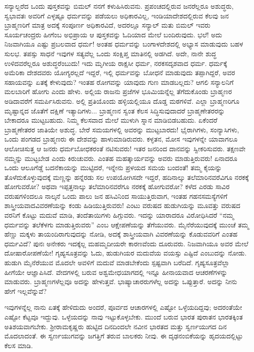 ಸನ್ಯಾಲ್\enginline{-}ಬರೆದ ಒಂದು ಪುಸ್ತಕವನ್ನು ಬಿಮಲ್ ನನಗೆ ಕಳುಹಿಸಿರುವನು. ಪ್ರಪಂಚದಲ್ಲಿರುವ ಜನರೆಲ್ಲರೂ ಅಶುದ್ಧರು, ಸ್ವಭಾವತಃ ಅವರಿಗೆ ಎಳ್ಳಷ್ಟೂ ಧರ್ಮವನ್ನು ಪಡೆಯಲು ಅಧಿಕಾರವಿಲ್ಲ, ಇಂಡಿಯಾದೇಶದಲ್ಲಿರುವ ಕೆಲವು ಜನ ಬ್ರಾಹ್ಮಣರಿಗೆ ಮಾತ್ರ ಅದಕ್ಕೆ ಸಂಪೂರ್ಣ ಅಧಿಕಾರವಿದೆ, ಅದರಲ್ಲೂ ಸನ್ಯಾಲ್ ಮತು ಬಿಮಲ್ ಇವರು ಸೂರ್ಯಚಂದ್ರರು\enginline{-} ಹೀಗೆಂಬ ಅಭಿಪ್ರಾಯ ಆ ಪುಸ್ತಕವನ್ನು ಓದಿಯಾದ ಮೇಲೆ ಬಂದಿರುವುದು. ಭಲೆ! ಅದು ನಿಜವಾಗಿಯೂ ಎಷ್ಟು ಪ್ರಬಲವಾದ ಧರ್ಮ! ಅಂತಹ ಧರ್ಮವನ್ನು ಬಂಗಾಳದೇಶದಲ್ಲಿ ಅಭ್ಯಾಸ ಮಾಡುವುದು ಬಹಳ ಸುಲಭ. ತಪಸ್ಸು ಸಾಧನೆ ಇವುಗಳ ಸತ್ಯವೆಲ್ಲ ಒಂದು ಸಂಕ್ಷಿಪ್ತ ಮಾತಿನಲ್ಲಿ ಅಡಗಿದೆ. ಅದೇ, ನಾನೇ ಶುದ್ಧ ಉಳಿದವರೆಲ್ಲರೂ ಅಶುದ್ಧರೆಂಬುದು! ಇದು ಮೃಗೀಯ ರಾಕ್ಷಸೀ ಧರ್ಮ, ನರಕಸದೃಶವಾದ ಧರ್ಮ. ಧರ್ಮಕ್ಕೆ ಅಮೆರಿಕಾ ದೇಶದವರು ಯೋಗ್ಯರಲ್ಲದೆ ಇದ್ದರೆ, ಇಲ್ಲಿ ಧರ್ಮವನ್ನು ಬೋಧನೆ ಮಾಡುವುದು ತಪ್ಪಾಗಿದ್ದರೆ, ಅವರ ಸಹಾಯವನ್ನು ಏತಕ್ಕೆ ಕೇಳುವುದು? ಇಂತಹ ರೋಗವನ್ನು ಯಾವುದು ಗುಣ ಮಾಡಬಲ್ಲದು? ಆಗಲಿ ಸನ್ಯಾಲನಿಗೆ ಮಲಬಾರಿಗೆ ಹೋಗು ಎಂದು ಹೇಳು. ಅಲ್ಲಿಯ ರಾಜನು ಪ್ರಜೆಗಳ ಭೂಮಿಯನ್ನೆಲ್ಲ ತೆಗೆದುಕೊಂಡು ಬ್ರಾಹ್ಮಣರ ಅಡಿದಾವರೆಗೆ ಸಮರ್ಪಿಸಿರುವನು. ಅಲ್ಲಿ ಪ್ರತಿಯೊಂದು ಹಳ್ಳಿಯಲ್ಲಿಯೂ ದೊಡ್ಡ ಮಠಗಳಿವೆ. ಎಲ್ಲಾ ಬ್ರಾಹ್ಮಣರಿಗೂ ಮೃಷ್ಟಾನ್ನದ ಜೊತೆಗೆ ದಕ್ಷಿಣೆ ಇತ್ಯಾದಿಗಳು... ಬ್ರಾಹ್ಮಣನ ಸ್ವಂತ ಕೆಲಸ ಸಿದ್ಧಿಸುವುದಾದರೆ ಬ್ರಾಹ್ಮಣೇತರರನ್ನು ಬೇಕಾದರೂ ಮುಟ್ಟಬಹುದು. ನಿಮ್ಮ ಕೆಲಸವಾದ ಮೇಲೆ ಮುಳುಗಿ ಸ್ನಾನ ಮಾಡಿಬಿಡಬಹುದು. ಏಕೆಂದರೆ ಬ್ರಾಹ್ಮಣೇತರರ ಜಾತಿಯೇ ಅಶುದ್ಧ. ಬೇರೆ ಸಮಯಗಳಲ್ಲಿ ಅವರನ್ನು ಮುಟ್ಟಬಾರದು! ಭೈರಾಗಿಗಳು, ಸಂನ್ಯಾಸಿಗಳು, ಒಂದು ಪಂಗಡದ ಬ್ರಾಹ್ಮಣರು ಈ ದೇಶವನ್ನು ಹಾಳುಮಾಡಿರುವರು. ಕಳ್ಳತನ, ಮೋಸ ಇವುಗಳನ್ನೇ ಯಾವಾಗಲೂ ಆಲೋಚಿಸುತ್ತ ಆ ಜನರು ಧರ್ಮಬೋಧಕರಂತೆ ನಟಿಸುವರು! ಇತರ ಜನರಿಂದ ದಾನವನ್ನು ಸ್ವೀಕರಿಸುವರು. ತಕ್ಷಣವೇ ನಮ್ಮನ್ನು ಮುಟ್ಟಬೇಡ ಎಂದು ಕಿರುಚುವರು. ಎಂತಹ ಮಹತ್ಕಾರ್ಯವನ್ನು ಅವರು ಮಾಡುತ್ತಿರುವರು!\enginline{-} ಏನಾದರೂ ಒಂದು ಆಲೂಗೆಡ್ಡೆ ಬದನೆಕಾಯನ್ನು ಮುಟ್ಟಿದರೆ, ಇನ್ನೇನು ಪ್ರಳಯದ ಸಮಯ ಬಂದಂತೆ! ತಮ್ಮ ಕೈಯನ್ನು ತೊಳೆದುಕೊಳ್ಳುವುದಕ್ಕೆ ಮಣ್ಣನ್ನು ಹನ್ನೆರಡು ಸಲ ಉಪಯೋಗಿಸದೇ ಇದ್ದರೆ, ಹದಿನಾಲ್ಕು ತಲೆಮಾರಿನವರೆವಿಗೂ ನರಕಕ್ಕೆ ಹೋಗುವರೋ? ಅಥವಾ ಇಪ್ಪತ್ತನಾಲ್ಕು ತಲೆಮಾರಿನವರೆಗೂ ನರಕಕ್ಕೆ ಹೋಗುವರೋ? ಕಳೆದ ಎರಡು ಸಾವಿರ ವರುಷಗಳಿಂದಲೂ ನಾಲ್ಕನೆ ಒಂದು ಪಾಲು ಜನ ಹಸಿವಿನಿಂದ ಸಾಯುತ್ತಿರುವಾಗ, ಇಂತಹ ಗಹನಸಮಸ್ಯೆಗಳಿಗೆ ಶಾಸ್ತ್ರೀಯವಾದವಿವರಣೆಯನ್ನು ಕಂಡು ಹಿಡಿಯುತ್ತಿರುವರು! ಎಂಟು ವರುಷದ ಹುಡುಗಿಯನ್ನು ಮೂವತ್ತು ವರುಷದ ವರನಿಗೆ ಕೊಟ್ಟು ಮದುವೆ ಮಾಡಿ, ತಂದೆತಾಯಿಗಳು ಹಿಗ್ಗುವರು. ಇದನ್ನು ಯಾರಾದರೂ ವಿರೋಧಿಸಿದರೆ ``ನಮ್ಮ ಧರ್ಮವನ್ನು ತಲೆಕೆಳಗು ಮಾಡುತ್ತಿರುವರು'' ಎಂಬ ಆಕ್ಷೇಪಣೆಯನ್ನು ತೆಗೆಯುವರು. ಮೈನೆರೆಯುವುದಕ್ಕೆ ಮುಂಚೆ ತಮ್ಮ ಹೆಣ್ಣು ಮಕ್ಕಳು ತಾಯಂದಿರಾಗುವುದನ್ನು ನೋಡಿ, ಅದಕ್ಕೆ ಶಾಸ್ತ್ರೀಯವಾಗಿ ವಿವರಣೆಯನ್ನು ಕೊಡುವವರಿಗೆ ಎಂತಹ ಧರ್ಮವಿದೆ? ಪುನಃ ಅನೇಕರು ಇದಕ್ಕೆಲ್ಲ ಮಹಮ್ಮದೀಯರೇ ಕಾರಣವೆಂದು ದೂರುವರು. ನಿಜವಾಗಿಯೂ ಅವರ ಮೇಲೆ ದೋಷಾರೋಪಣೆಯೇ! ಗೃಹ್ಯಸೂತ್ರವನ್ನು ಓದು, ಹುಡುಗಿಯರ ಮದುವೆಯ ವಯಸ್ಸು ಎಷ್ಟಿದೆ ಎಂಬುದನ್ನು ನೋಡು. ಹುಡುಗಿ ಮೈನೆರೆಯುವ ಮೊದಲೇ ಅವಳಿಗೆ ಮದುವೆ ಮಾಡಬೇಕೆಂದು ಸ್ಪಷ್ಟವಾಗಿ ಬರೆದಿದೆ. ಗೃಹ್ಯಸೂತ್ರವೆಲ್ಲಾ ಹೀಗೆಯೇ ಆಜ್ಞಾಪಿಸಿದೆ. ವೇದಗಳಲ್ಲಿ ಬರುವ ಅಶ್ವಮೇಧಯಾಗದಲ್ಲಿ ಇನ್ನೂ ಹೀನಾಯವಾದ ಆಚರಣೆಗಳನ್ನು ಮಾಡುವರು. ಬ್ರಾಹ್ಮಣಗಳೆಲ್ಲವೂ ಅದನ್ನು ಹೇಳುತ್ತವೆ. ಭಾಷ್ಯಾಚಾರರುಗಳೆಲ್ಲ ಅದನ್ನು ಒಪ್ಪುತ್ತಾರೆ. ಅದನ್ನು ನೀನು ಹೇಗೆ ಇಲ್ಲವೆನ್ನುವೆ?

ಇವುಗಳನ್ನೆಲ್ಲ ನಾನು ಏತಕ್ಕೆ ಹೇಳಿದುದು ಅಂದರೆ, ಪೂರ್ವದ ಆಚಾರಗಳಲ್ಲಿ ಎಷ್ಟೋ ಒಳ್ಳೆಯದಿದ್ದವು; ಅದರಂತೆಯೇ ಎಷ್ಟೋ ಕೆಟ್ಟವೂ ಇದ್ದುವು. ಒಳ್ಳೆಯದನ್ನು ನಾವು ಇಟ್ಟುಕೊಳ್ಳಬೇಕು. ಮುಂದೆ ಬರುವ ಭಾರತ ಪುರಾತನ ಭಾರತಕ್ಕಿಂತ ಅತಿಶಯವಾಗಬೇಕು. ಶ‍್ರೀರಾಮಕೃಷ್ಣರು ಹುಟ್ಟಿದ ದಿನದಿಂದಲೇ ನವೀನ ಭಾರತದ ಮತ್ತು ಸ್ವರ್ಣಯುಗದ ದಿನ ಮೊದಲಾದಂತೆ. ಈ ಸ್ವರ್ಣಯುಗವನ್ನು ಜಗತ್ತಿಗೆ ತರುವ ಬಾಲಕರು ನೀವು. ಈ ದೃಢನಂಬಿಕೆಯನ್ನು ಹೃದಯದಲ್ಲಿಟ್ಟು ಕೆಲಸ ಮಾಡಿ.

